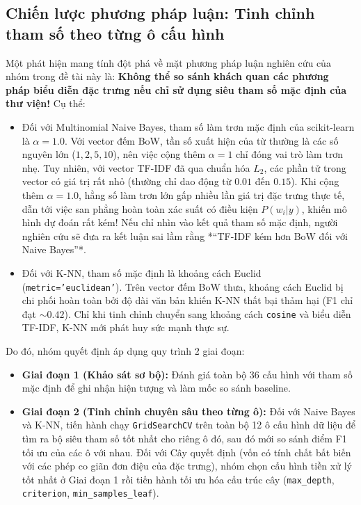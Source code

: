 \subsection{Chiến lược phương pháp luận: Tinh chỉnh tham số theo từng ô cấu hình}
Một phát hiện mang tính đột phá về mặt phương pháp luận nghiên cứu của nhóm trong đề tài này là: \textbf{Không thể so sánh khách quan các phương pháp biểu diễn đặc trưng nếu chỉ sử dụng siêu tham số mặc định của thư viện!}
Cụ thể:
\begin{itemize}
    \item Đối với Multinomial Naive Bayes, tham số làm trơn mặc định của scikit-learn là $\alpha = 1.0$. Với vector đếm BoW, tần số xuất hiện của từ thường là các số nguyên lớn ($1, 2, 5, 10$), nên việc cộng thêm $\alpha = 1$ chỉ đóng vai trò làm trơn nhẹ. Tuy nhiên, với vector TF-IDF đã qua chuẩn hóa $L_2$, các phần tử trong vector có giá trị rất nhỏ (thường chỉ dao động từ $0.01$ đến $0.15$). Khi cộng thêm $\alpha = 1.0$, hằng số làm trơn lớn gấp nhiều lần giá trị đặc trưng thực tế, dẫn tới việc san phẳng hoàn toàn xác suất có điều kiện $P(w_i|y)$, khiến mô hình dự đoán rất kém! Nếu chỉ nhìn vào kết quả tham số mặc định, người nghiên cứu sẽ đưa ra kết luận sai lầm rằng *“TF-IDF kém hơn BoW đối với Naive Bayes”*.
    \item Đối với K-NN, tham số mặc định là khoảng cách Euclid (\texttt{metric='euclidean'}). Trên vector đếm BoW thưa, khoảng cách Euclid bị chi phối hoàn toàn bởi độ dài văn bản khiến K-NN thất bại thảm hại (F1 chỉ đạt $\sim 0.42$). Chỉ khi tinh chỉnh chuyển sang khoảng cách \texttt{cosine} và biểu diễn TF-IDF, K-NN mới phát huy sức mạnh thực sự.
\end{itemize}

Do đó, nhóm quyết định áp dụng quy trình 2 giai đoạn:
\begin{itemize}
    \item \textbf{Giai đoạn 1 (Khảo sát sơ bộ):} Đánh giá toàn bộ 36 cấu hình với tham số mặc định để ghi nhận hiện tượng và làm mốc so sánh baseline.
    \item \textbf{Giai đoạn 2 (Tinh chỉnh chuyên sâu theo từng ô):} Đối với Naive Bayes và K-NN, tiến hành chạy \texttt{GridSearchCV} trên toàn bộ 12 ô cấu hình dữ liệu để tìm ra bộ siêu tham số tốt nhất cho riêng ô đó, sau đó mới so sánh điểm F1 tối ưu của các ô với nhau. Đối với Cây quyết định (vốn có tính chất bất biến với các phép co giãn đơn điệu của đặc trưng), nhóm chọn cấu hình tiền xử lý tốt nhất ở Giai đoạn 1 rồi tiến hành tối ưu hóa cấu trúc cây (\texttt{max\_depth}, \texttt{criterion}, \texttt{min\_samples\_leaf}).
\end{itemize}

